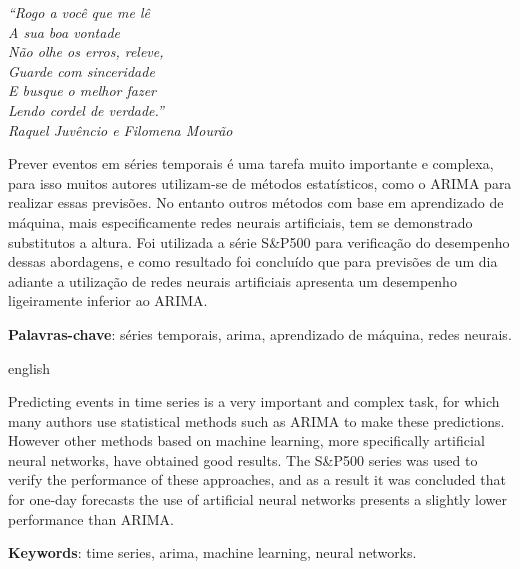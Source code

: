 \documentclass[
    12pt,
    oneside,
    a4paper,
    english,
    brazil
]{abntex2}
\begin{document}
\frenchspacing

\imprimircapa{}

\imprimirfolhaderosto{}

\begin{epigrafe}
    \vspace*{\fill}
    \begin{flushright}
        \textit{``Rogo a você que me lê\\
        A sua boa vontade\\
        Não olhe os erros, releve,\\
        Guarde com sinceridade\\
        E busque o melhor fazer\\
        Lendo cordel de verdade.''\\
        Raquel Juvêncio e Filomena Mourão}
    \end{flushright}
\end{epigrafe}

\begin{resumo}

    Prever  eventos  em  séries  temporais  é uma  tarefa  muito  importante  e
    complexa,  para isso  muitos autores  utilizam-se de  métodos estatísticos,
    como  o ARIMA  para realizar  essas  previsões. No  entanto outros  métodos
    com  base em  aprendizado de  máquina, mais  especificamente redes  neurais
    artificiais, tem se demonstrado substitutos a altura. Foi utilizada a série
    S\&P500 para verificação do desempenho  dessas abordagens, e como resultado
    foi concluído  que para previsões de  um dia adiante a  utilização de redes
    neurais  artificiais  apresenta  um  desempenho  ligeiramente  inferior  ao
    ARIMA\@.

    \textbf{Palavras-chave}: séries temporais, arima, aprendizado de máquina,
    redes neurais.
\end{resumo}

\begin{resumo}[Abstract]
    \begin{otherlanguage*}{english}

    Predicting events  in time  series is  a very  important and  complex task,
    for  which many  authors  use statistical  methods such  as  ARIMA to  make
    these predictions.  However other methods  based on machine  learning, more
    specifically artificial  neural networks,  have obtained good  results. The
    S\&P500 series was used to verify  the performance of these approaches, and
    as  a  result it  was  concluded  that for  one-day  forecasts  the use  of
    artificial  neural  networks presents  a  slightly  lower performance  than
    ARIMA\@.

    \textbf{Keywords}: time series, arima, machine learning, neural
    networks.
    \end{otherlanguage*}
\end{resumo}
\end{document}
